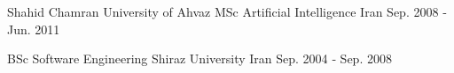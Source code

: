 


\begin{cventries}


\cventry
{Shahid Chamran University of Ahvaz} %
{MSc Artificial Intelligence} %
{Iran} %
{Sep. 2008 ‑ Jun. 2011} %
{ %
}

\cventry
{BSc Software Engineering} %
{Shiraz University} %
{Iran} %
{Sep. 2004 ‑ Sep. 2008} %
{ %
}

\end{cventries}